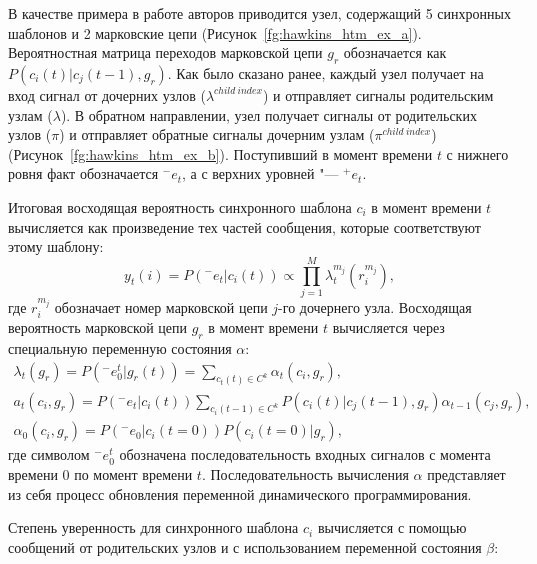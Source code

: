 В качестве примера в работе авторов приводится узел, содержащий 5 синхронных шаблонов и 2 марковские цепи (Рисунок~\ref{fg:hawkins_htm_ex_a}). Вероятностная матрица переходов марковской цепи $g_r$ обозначается как $P(c_i(t)|c_j(t-1),g_r)$. Как было сказано ранее, каждый узел получает на вход сигнал от дочерних узлов ($\lambda^{child\ index}$) и отправляет сигналы родительским узлам ($\lambda$). В обратном направлении, узел получает сигналы от родительских узлов ($\pi$) и отправляет обратные сигналы дочерним узлам ($\pi^{child\ index}$) (Рисунок~\ref{fg:hawkins_htm_ex_b}). Поступивший в момент времени $t$ с нижнего ровня факт обозначается ${}^-e_t$, а с верхних уровней "--- ${}^+e_t$.

Итоговая восходящая вероятность синхронного шаблона $c_i$ в момент времени $t$ вычисляется как произведение тех частей сообщения, которые соответствуют этому шаблону:
\begin{equation}
	y_t(i)=P({}^-e_t|c_i(t))\varpropto\prod_{j=1}^{M}\lambda_t^{m_j}(r_i^{m_j}),
\end{equation}
где $r_i^{m_j}$ обозначает номер марковской цепи $j$-го дочернего узла. Восходящая вероятность марковской цепи $g_r$ в момент времени $t$ вычисляется через специальную переменную состояния $\alpha$:
\begin{equation}
	\begin{split}
	\lambda_t(g_r)=P({}^-e_0^t|g_r(t)) = \sum_{c_t(t)\in C^k}\alpha_t(c_i, g_r),\\
	a_t(c_i,g_r )=P({}^-e_t|c_i(t))\sum_{c_i(t-1)\in C^k}P(c_i(t)|c_j(t-1),g_r)\alpha_{t-1}(c_j,g_r),\\
	\alpha_0(c_i,g_r)=P({}^-e_0|c_i(t=0))P(c_i(t=0)|g_r),
	\end{split}
\end{equation}
где символом ${}^-e_0^t$ обозначена последовательность входных сигналов с момента времени $0$ по момент времени $t$. Последовательность вычисления $\alpha$ представляет из себя процесс обновления переменной динамического программирования.

Степень уверенность для синхронного шаблона $c_i$ вычисляется с помощью сообщений от родительских узлов и с использованием переменной состояния $\beta$:

